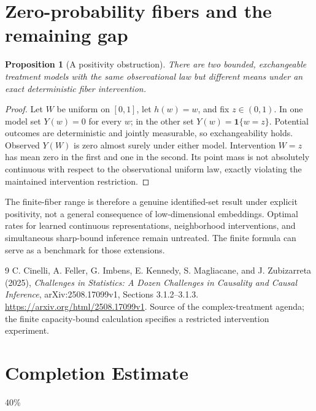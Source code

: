 \documentclass[11pt,a4paper]{article}
\newtheorem{proposition}[theorem]{Proposition}
\theoremstyle{definition}
\theoremstyle{remark}
\newcommand{\ind}{\mathbf{1}}
\begin{document}
\section{Zero-probability fibers and the remaining gap}
\begin{proposition}[A positivity obstruction]
There are two bounded, exchangeable treatment models with the same observational law but different means under an exact deterministic fiber intervention.
\end{proposition}
\begin{proof}
Let $W$ be uniform on $[0,1]$, let $h(w)=w$, and fix $z\in(0,1)$. In one model set $Y(w)=0$ for every $w$; in the other set $Y(w)=\ind\{w=z\}$. Potential outcomes are deterministic and jointly measurable, so exchangeability holds. Observed $Y(W)$ is zero almost surely under either model. Intervention $W=z$ has mean zero in the first and one in the second. Its point mass is not absolutely continuous with respect to the observational uniform law, exactly violating the maintained intervention restriction.
\end{proof}
The finite-fiber range is therefore a genuine identified-set result under explicit positivity, not a general consequence of low-dimensional embeddings. Optimal rates for learned continuous representations, neighborhood interventions, and simultaneous sharp-bound inference remain untreated. The finite formula can serve as a benchmark for those extensions.
\begin{thebibliography}{9}
 C. Cinelli, A. Feller, G. Imbens, E. Kennedy, S. Magliacane, and J. Zubizarreta (2025), \emph{Challenges in Statistics: A Dozen Challenges in Causality and Causal Inference}, arXiv:2508.17099v1, Sections 3.1.2--3.1.3. \url{https://arxiv.org/html/2508.17099v1}. Source of the complex-treatment agenda; the finite capacity-bound calculation specifies a restricted intervention experiment.
\end{thebibliography}

\section{Completion Estimate}
40\%
\end{document}

